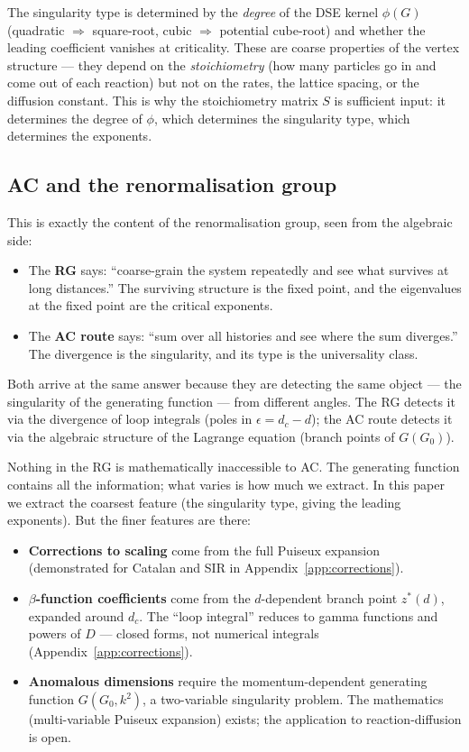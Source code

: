 \documentclass[11pt,a4paper]{article}
\theoremstyle{definition}
\begin{document}
The singularity type is determined by the \emph{degree} of the DSE
kernel $\phi(G)$ (quadratic $\Rightarrow$ square-root, cubic
$\Rightarrow$ potential cube-root) and whether the leading coefficient
vanishes at criticality. These are coarse properties of the vertex
structure --- they depend on the \emph{stoichiometry} (how many
particles go in and come out of each reaction) but not on the rates,
the lattice spacing, or the diffusion constant. This is why the
stoichiometry matrix $S$ is sufficient input: it determines the degree
of $\phi$, which determines the singularity type, which determines the
exponents.

\subsection{AC and the renormalisation group}

This is exactly the content of the renormalisation group, seen from
the algebraic side:
\begin{itemize}
\item The \textbf{RG} says: ``coarse-grain the system repeatedly and see
      what survives at long distances.'' The surviving structure is the
      fixed point, and the eigenvalues at the fixed point are the
      critical exponents.
\item The \textbf{AC route} says: ``sum over all histories and see where
      the sum diverges.'' The divergence is the singularity, and its
      type is the universality class.
\end{itemize}
Both arrive at the same answer because they are detecting the same
object --- the singularity of the generating function --- from different
angles. The RG detects it via the divergence of loop integrals (poles
in $\epsilon = d_c - d$); the AC route detects it via the algebraic
structure of the Lagrange equation (branch points of $G(G_0)$).

Nothing in the RG is mathematically inaccessible to AC. The
generating function contains all the information; what varies is how
much we extract. In this paper we extract the coarsest feature (the
singularity type, giving the leading exponents). But the finer
features are there:
\begin{itemize}
\item \textbf{Corrections to scaling} come from the full Puiseux
      expansion (demonstrated for Catalan and SIR in
      Appendix~\ref{app:corrections}).
\item \textbf{$\beta$-function coefficients} come from the
      $d$-dependent branch point $z^*(d)$, expanded around $d_c$.
      The ``loop integral'' reduces to gamma functions and powers of
      $D$ --- closed forms, not numerical integrals
      (Appendix~\ref{app:corrections}).
\item \textbf{Anomalous dimensions} require the momentum-dependent
      generating function $G(G_0, k^2)$, a two-variable singularity
      problem. The mathematics (multi-variable Puiseux expansion)
      exists; the application to reaction-diffusion is open.
\end{itemize}
\end{document}
